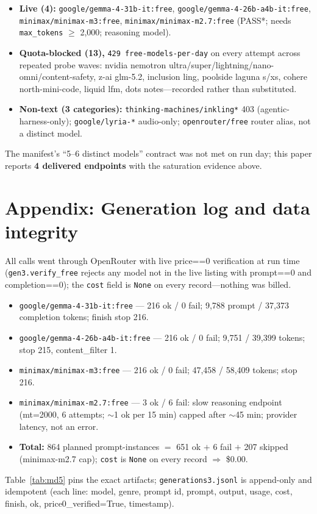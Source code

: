 \documentclass[11pt]{article}
\begin{document}
\begin{itemize}
\item \textbf{Live (4):} \texttt{google/gemma-4-31b-it:free}, \texttt{google/gemma-4-26b-a4b-it:free}, \texttt{minimax/minimax-m3:free}, \texttt{minimax/minimax-m2.7:free} (PASS*; needs \texttt{max\_tokens} $\geq$ 2{,}000; reasoning model).
\item \textbf{Quota-blocked (13),} \texttt{429 free-models-per-day} on every attempt across repeated probe waves: nvidia nemotron ultra/super/lightning/nano-omni/content-safety, z-ai glm-5.2, inclusion ling, poolside laguna s/xs, cohere north-mini-code, liquid lfm, dots notes---recorded rather than substituted.
\item \textbf{Non-text (3 categories):} \texttt{thinking-machines/inkling*} 403 (agentic-harness-only); \texttt{google/lyria-*} audio-only; \texttt{openrouter/free} router alias, not a distinct model.
\end{itemize}

The manifest's ``5--6 distinct models'' contract was not met on run day; this paper reports \textbf{4 delivered endpoints} with the saturation evidence above.

\section{Appendix: Generation log and data integrity}
\label{sec:app-generation}

All calls went through OpenRouter with live price==0 verification at run time (\texttt{gen3.verify\_free} rejects any model not in the live listing with prompt==0 and completion==0); the \texttt{cost} field is \texttt{None} on every record---nothing was billed.

\begin{itemize}
\item \texttt{google/gemma-4-31b-it:free} --- 216 ok / 0 fail; 9{,}788 prompt / 37{,}373 completion tokens; finish stop 216.
\item \texttt{google/gemma-4-26b-a4b-it:free} --- 216 ok / 0 fail; 9{,}751 / 39{,}399 tokens; stop 215, content\_filter 1.
\item \texttt{minimax/minimax-m3:free} --- 216 ok / 0 fail; 47{,}458 / 58{,}409 tokens; stop 216.
\item \texttt{minimax/minimax-m2.7:free} --- 3 ok / 6 fail: slow reasoning endpoint (mt=2000, 6 attempts; $\sim$1 ok per 15 min) capped after $\sim$45 min; provider latency, not an error.
\item \textbf{Total:} 864 planned prompt-instances $=$ 651 ok $+$ 6 fail $+$ 207 skipped (minimax-m2.7 cap); \texttt{cost} is \texttt{None} on every record ${\Rightarrow}$ \$0.00.
\end{itemize}

Table~\ref{tab:md5} pins the exact artifacts; \texttt{generations3.jsonl} is append-only and idempotent (each line: model, genre, prompt id, prompt, output, usage, cost, finish, ok, price0\_verified=True, timestamp).
\end{document}
